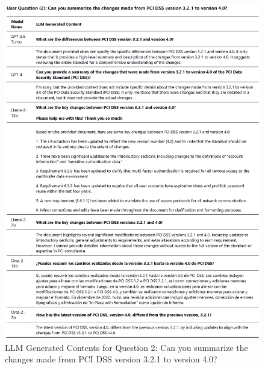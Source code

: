 \documentclass[runningheads]{llncs}
\begin{document}
\begin{figure}
    \centering
    \includegraphics[width=1.3\linewidth]{figures/question_2.eps}
    \caption{LLM Generated Contents for Question 2: Can you summarize the changes made from PCI DSS version 3.2.1 to version 4.0?}
    \label{fig:Question  2}
\end{figure}
\end{document}
